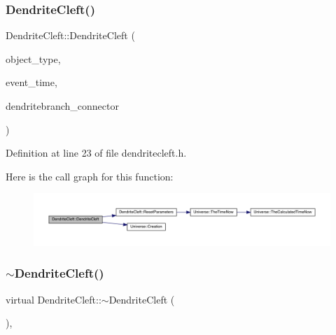 \subsubsection{\texorpdfstring{Dendrite\+Cleft()}{DendriteCleft()}\hspace{0.1cm}{\footnotesize\ttfamily [4/4]}}
{\footnotesize\ttfamily Dendrite\+Cleft\+::\+Dendrite\+Cleft (\begin{DoxyParamCaption}\item[{unsigned int}]{object\+\_\+type,  }\item[{std\+::chrono\+::time\+\_\+point$<$ \mbox{\hyperlink{universe_8h_a0ef8d951d1ca5ab3cfaf7ab4c7a6fd80}{Clock}} $>$}]{event\+\_\+time,  }\item[{\mbox{\hyperlink{class_dendrite_branch}{Dendrite\+Branch}} \&}]{dendritebranch\+\_\+connector }\end{DoxyParamCaption})\hspace{0.3cm}{\ttfamily [inline]}}



Definition at line 23 of file dendritecleft.\+h.

Here is the call graph for this function\+:\nopagebreak
\begin{figure}[H]
\begin{center}
\leavevmode
\includegraphics[width=350pt]{class_dendrite_cleft_abcb81284cd9bd7ee2863eecfb6b59f62_cgraph}
\end{center}
\end{figure}
\mbox{\label{class_dendrite_cleft_ad99958c45fa63f2f68b65d7e5ba45b32}} 
\subsubsection{\texorpdfstring{$\sim$\+Dendrite\+Cleft()}{~DendriteCleft()}}
{\footnotesize\ttfamily virtual Dendrite\+Cleft\+::$\sim$\+Dendrite\+Cleft (\begin{DoxyParamCaption}{ }\end{DoxyParamCaption})\hspace{0.3cm}{\ttfamily [inline]}, {\ttfamily [virtual]}}

